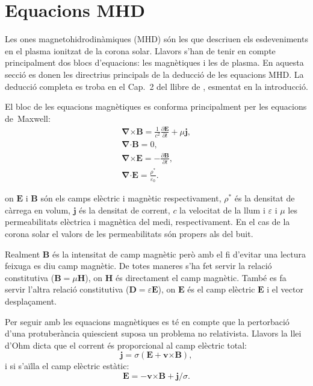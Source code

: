\documentclass[12pt,a4paper]{article}
\numberwithin{equation}{section}
\begin{document}
\clearpage


\section{Equacions MHD} \label{sec:equacionsMHD}
Les ones magnetohidrodinàmiques (MHD) són les que descriuen els esdeveniments en el plasma ionitzat de la corona solar.
Llavors s'han de tenir en compte principalment dos blocs d'equacions: les magnètiques i les de plasma.
En aquesta secció es donen les directrius principals de la deducció de les equacions MHD. La deducció completa es troba en el Cap.~2 del llibre de \textcite{Priest_2014}, esmentat en la introducció.

El bloc de les equacions magnètiques es conforma principalment per les equacions de~Maxwell:
\begin{gather}
    \bm{\nabla} \bm{\times} \bm{B} = \frac{1}{c^2} \frac{\partial \bm{E}}{\partial t} + \mu \bm{j}, \tag{2.1} \label{eq.2.1} \\
    \bm{\nabla} \bm{\cdot} \bm{B} = 0, \tag{2.2} \label{eq.2.2} \\
    \bm{\nabla} \bm{\times} \bm{E} = - \frac{\partial \bm{B}}{\partial t}, \tag{2.3} \label{eq.2.3} \\
    \bm{\nabla} \bm{\cdot} \bm{E} = \frac{\rho^*}{\varepsilon_0}. \tag{2.4} \label{eq.2.4}
\end{gather}

on $\bm{E}$ i $\bm{B}$ són els camps elèctric i magnètic respectivament, $\rho^*$ és la densitat de càrrega en volum, $\bm{j}$ és la densitat de corrent, $c$ la velocitat de la llum i $\varepsilon$ i $\mu$ les permeabilitats elèctrica i magnètica del medi, respectivament.
En el cas de la corona solar el valors de les permeabilitats són propers als del buit.

Realment $\bm{B}$ és la intensitat de camp magnètic però amb el fi d'evitar una lectura feixuga es diu camp magnètic.
De totes maneres s'ha fet servir la relació constitutiva ($\bm{B} = \mu \bm{H}$), on $\bm{H}$ és directament el camp magnètic.
També es fa servir l'altra relació constitutiva ($\bm{D} = \varepsilon \bm{E}$), on $\bm{E}$ és el camp elèctric $\bm{E}$ i el vector desplaçament.

Per seguir amb les equacions magnètiques es té en compte que la pertorbació d'una protuberància quiescient suposa un problema no relativista.
Llavors la llei d'Ohm dicta que el corrent és proporcional al camp elèctric total:
\begin{equation}
    \bm{j} =  \sigma (\bm{E} + \bm{v} \bm{\times} \bm{B}), \tag{2.5} \label{eq.2.5}
\end{equation}
i si s'aïlla el camp elèctric estàtic:
\begin{equation}
    \bm{E} = - \bm{v} \bm{\times} \bm{B} + \bm{j}/\sigma. \tag{2.6} \label{eq.2.6}
\end{equation}
\end{document}
